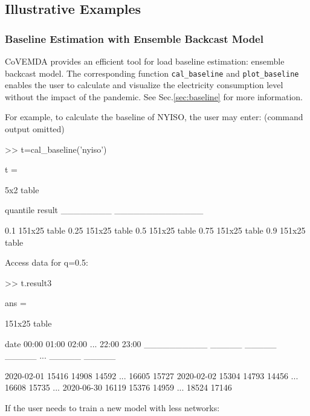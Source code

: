 \documentclass[10pt]{article}
\newcommand{\covemda}{CoVEMDA}
\numberwithin{equation}{section}
\numberwithin{table}{section}
\numberwithin{figure}{section}
\begin{document}
\clearpage
\subsection{Illustrative Examples}

\subsubsection{Baseline Estimation with Ensemble Backcast Model}

\covemda{} provides an efficient tool for load baseline estimation: ensemble backcast model. The corresponding function \verb!cal_baseline! and \verb!plot_baseline! enables the user to calculate and visualize the electricity consumption level without the impact of the pandemic. See Sec.\ref{sec:baseline} for more information.

For example, to calculate the baseline of NYISO, the user may enter: (command output omitted)

\begin{Code}
>> t=cal_baseline('nyiso')

t =

  5x2 table

    quantile        result    
    ________    ______________

       0.1      {151x25 table}
      0.25      {151x25 table}
       0.5      {151x25 table}
      0.75      {151x25 table}
       0.9      {151x25 table}
\end{Code}

Access data for q=0.5:

\begin{Code}
>> t.result{3}

ans =

  151x25 table

       date       00:00    01:00    02:00    ...    22:00    23:00
    __________    _____    _____    _____    ...    _____    _____

    2020-02-01    15416    14908    14592    ...    16605    15727
    2020-02-02    15304    14793    14456    ...    16608    15735
    ...
    2020-06-30    16119    15376    14959    ...    18524    17146
\end{Code}

If the user needs to train a new model with less networks:
\end{document}

